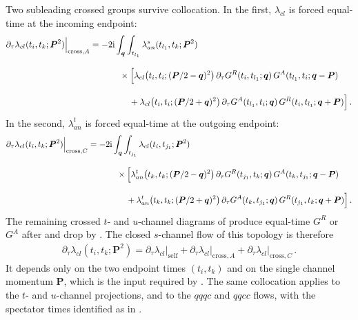 \documentclass[reprint,english,superscriptaddress,preprintnumbers,amsmath,amssymb,aps,prd]{revtex4-1}
\begin{document}
Two subleading crossed groups survive collocation. In the first, $\lambda_{cl}$ is forced equal-time at the incoming endpoint:
\begin{align}
    \partial_{\tau}\lambda_{cl}(t_i,t_k;\boldsymbol{P}^{2})\Big|_{\mathrm{cross},A}
    &=-2\mathrm{i}\int_{\boldsymbol{q}}\int_{t_{l_1}}\lambda_{an}^{s}(t_{l_1},t_k;\boldsymbol{P}^{2})\nonumber\\[2ex]
    &\hspace{1.2cm}\times\Big[\lambda_{cl}\bigl(t_i,t_i;(\boldsymbol{P}/2-\boldsymbol{q})^{2}\bigr)\,\partial_{\tau}G^{R}(t_i,t_{l_1};\boldsymbol{q})\,G^{A}(t_{l_1},t_i;\boldsymbol{q}-\boldsymbol{P})\nonumber\\[2ex]
    &\hspace{1.6cm}+\lambda_{cl}\bigl(t_i,t_i;(\boldsymbol{P}/2+\boldsymbol{q})^{2}\bigr)\,\partial_{\tau}G^{A}(t_{l_1},t_i;\boldsymbol{q})\,G^{R}(t_i,t_{l_1};\boldsymbol{q}+\boldsymbol{P})\Big]\,.
    \label{eq:lamcl-s-A}
\end{align}
In the second, $\lambda_{an}^{t}$ is forced equal-time at the outgoing endpoint:
\begin{align}
    \partial_{\tau}\lambda_{cl}(t_i,t_k;\boldsymbol{P}^{2})\Big|_{\mathrm{cross},C}
    &=-2\mathrm{i}\int_{\boldsymbol{q}}\int_{t_{j_1}}\lambda_{cl}(t_i,t_{j_1};\boldsymbol{P}^{2})\nonumber\\[2ex]
    &\hspace{1.2cm}\times\Big[\lambda_{an}^{t}\bigl(t_k,t_k;(\boldsymbol{P}/2-\boldsymbol{q})^{2}\bigr)\,\partial_{\tau}G^{R}(t_{j_1},t_k;\boldsymbol{q})\,G^{A}(t_k,t_{j_1};\boldsymbol{q}-\boldsymbol{P})\nonumber\\[2ex]
    &\hspace{1.6cm}+\lambda_{an}^{t}\bigl(t_k,t_k;(\boldsymbol{P}/2+\boldsymbol{q})^{2}\bigr)\,\partial_{\tau}G^{A}(t_k,t_{j_1};\boldsymbol{q})\,G^{R}(t_{j_1},t_k;\boldsymbol{q}+\boldsymbol{P})\Big]\,.
    \label{eq:lamcl-s-C}
\end{align}
The remaining crossed $t$- and $u$-channel diagrams of  produce equal-time $G^{R}$ or $G^{A}$ after  and drop by . The closed $s$-channel flow of this topology is therefore
\begin{align}
    \partial_{\tau}\lambda_{cl}(t_i,t_k;\boldsymbol{P}^{2})
    =\partial_{\tau}\lambda_{cl}\Big|_{\mathrm{self}}
    +\partial_{\tau}\lambda_{cl}\Big|_{\mathrm{cross},A}
    +\partial_{\tau}\lambda_{cl}\Big|_{\mathrm{cross},C}\,.
    \label{eq:lamcl-s-closed}
\end{align}
It depends only on the two endpoint times $(t_i,t_k)$ and on the single channel momentum $\boldsymbol{P}$, which is the input required by . The same collocation applies to the $t$- and $u$-channel projections, and to the $qqqc$ and $qqcc$ flows, with the spectator times identified as in .
\end{document}
